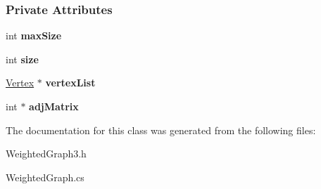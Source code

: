 \subsubsection*{Private Attributes}
\begin{DoxyCompactItemize}
\item 
int {\bfseries max\+Size}\hypertarget{class_wt_graph_af9aaa9d6a0263b17803d8da652137ebf}{}\label{class_wt_graph_af9aaa9d6a0263b17803d8da652137ebf}

\item 
int {\bfseries size}\hypertarget{class_wt_graph_a295d3a82399a2b7d02b90779266b0ac5}{}\label{class_wt_graph_a295d3a82399a2b7d02b90779266b0ac5}

\item 
\hyperlink{class_vertex}{Vertex} $\ast$ {\bfseries vertex\+List}\hypertarget{class_wt_graph_a6e99e08584fb7495542310d854d194fb}{}\label{class_wt_graph_a6e99e08584fb7495542310d854d194fb}

\item 
int $\ast$ {\bfseries adj\+Matrix}\hypertarget{class_wt_graph_a1fa6d8f87dc5c82a02e94c58a8291c09}{}\label{class_wt_graph_a1fa6d8f87dc5c82a02e94c58a8291c09}

\end{DoxyCompactItemize}


The documentation for this class was generated from the following files\+:\begin{DoxyCompactItemize}
\item 
Weighted\+Graph3.\+h\item 
Weighted\+Graph.\+cs\end{DoxyCompactItemize}
